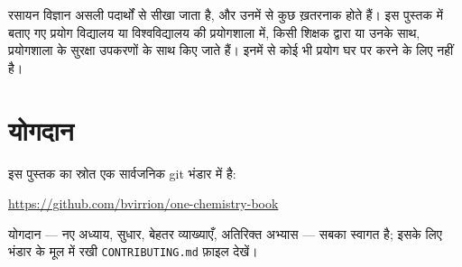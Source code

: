 रसायन विज्ञान असली पदार्थों से सीखा जाता है, और उनमें से कुछ ख़तरनाक होते हैं।
इस पुस्तक में बताए गए प्रयोग विद्यालय या विश्वविद्यालय की प्रयोगशाला में, किसी
शिक्षक द्वारा या उनके साथ, प्रयोगशाला के सुरक्षा उपकरणों के साथ किए जाते हैं।
इनमें से कोई भी प्रयोग घर पर करने के लिए नहीं है।

\section*{योगदान}

इस पुस्तक का स्रोत एक सार्वजनिक git भंडार में है:
\begin{center}
\url{https://github.com/bvirrion/one-chemistry-book}
\end{center}
योगदान --- नए अध्याय, सुधार, बेहतर व्याख्याएँ, अतिरिक्त अभ्यास ---
सबका स्वागत है; इसके लिए भंडार के मूल में रखी \texttt{CONTRIBUTING.md}
फ़ाइल देखें।

